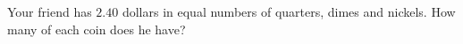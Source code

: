 Your friend has $2.40$ dollars in equal numbers of quarters, dimes and nickels. How many of each coin does he have?

